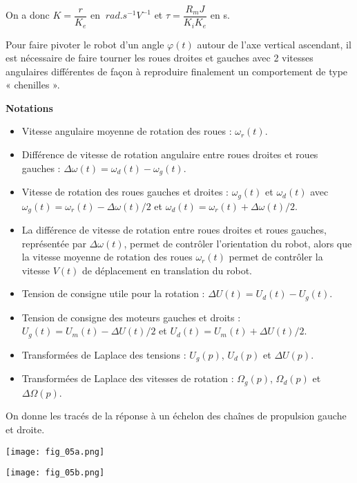 \begin{multicols}{2}
\begin{corrige}
On a donc $K=\dfrac{r}{K_e} $  en $\SI{}{rad.s^{-1}V^{-1}}$ et $\tau=\dfrac{R_mJ}{K_iK_e}$ en s.
\end{corrige}
\else
\fi
\ifprof
\else
Pour faire pivoter le robot d’un angle $\varphi(t)$ autour de l’axe vertical ascendant, il est nécessaire de faire tourner les roues droites et gauches avec 2 vitesses angulaires différentes de façon à reproduire finalement un comportement de type « chenilles ». 

\textbf{Notations}
\begin{itemize}
\item Vitesse angulaire moyenne de rotation des roues : $\omega_r (t)$. 
\item Différence de vitesse de rotation angulaire entre roues droites et roues gauches : $\Delta\omega(t) = \omega_d (t) - \omega_g (t)$.
\item Vitesse de rotation des roues gauches et droites : $\omega_g (t)$ et $\omega_d (t)$ avec $\omega_g (t)  = \omega_r (t)  - \Delta \omega(t)/2$  et $\omega_d (t)  = \omega_r (t)  + \Delta\omega(t)/2$. 
\item La différence de vitesse de rotation entre roues droites et roues gauches, représentée par $\Delta \omega(t)$, permet de contrôler l’orientation du robot, alors que la vitesse moyenne de rotation des roues $\omega_r (t)$  permet de contrôler la vitesse $V(t)$ de déplacement en translation du robot. 
\item Tension de consigne utile pour la rotation : $\Delta U(t)  = U_d (t)  - U_g (t)$. 
\item Tension de consigne des moteurs gauches et droits :
$U_g(t)=U_m (t)-\Delta U(t)/2$
et $U_d (t)=U_m (t)+\Delta U(t)/2$. 
\item Transformées de Laplace des tensions : $U_g (p)$, $U_d (p)$ et $\Delta U(p)$. 
\item Transformées de Laplace des vitesses de rotation : $\Omega_g (p)$, $\Omega_d (p)$ et $\Delta \Omega(p)$. 
\end{itemize}
\fi


\ifprof
\else
On donne les tracés de la réponse à un échelon des chaînes de propulsion gauche et droite.  

\begin{center}
\texttt{[image: fig\_05a.png]}
\end{center}

\begin{center}
\texttt{[image: fig\_05b.png]}
\end{center}
\fi



\end{multicols}
